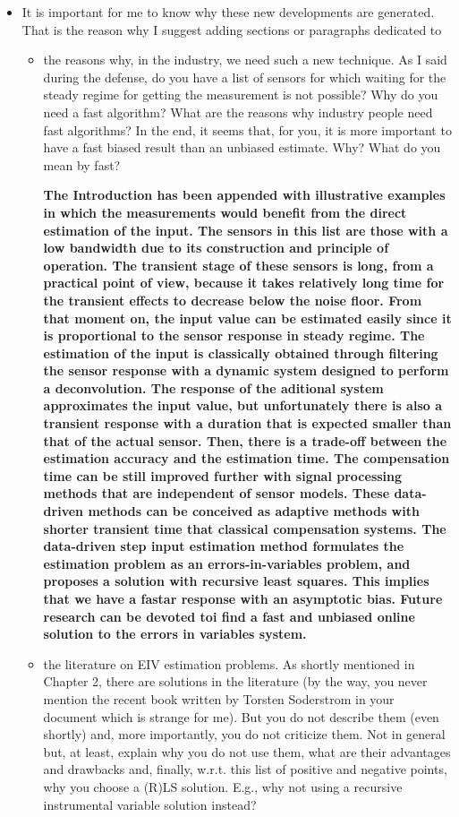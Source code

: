 \documentclass[11pt]{article}
\begin{document}
\begin{itemize}
	\item It is important for me to know why these new developments are generated. That is the reason why I suggest adding sections or paragraphs dedicated to
    \begin{itemize}
        \item the reasons why, in the industry, we need such a new technique. As I said during the defense, do you have a list of sensors for which waiting for the steady regime for getting the measurement is not possible? Why do you need a fast algorithm? What are the reasons why industry people need fast algorithms? In the end, it seems that, for you, it is more important to have a fast biased result than an unbiased estimate. Why? What do you mean by fast?
        
        {\bfseries The Introduction has been appended with illustrative examples in which the measurements would benefit from the direct estimation of the input. The sensors in this list are those with a low bandwidth due to its construction and principle of operation. The transient stage of these sensors is long, from a practical point of view, because it takes relatively long time for the transient effects to decrease below the noise floor. From that moment on, the input value can be estimated easily since it is proportional to the sensor response in steady regime. The estimation of the input is classically obtained through filtering the sensor response with a dynamic system designed to perform a deconvolution. The response of the aditional system approximates the input value, but unfortunately there is also a transient response with a duration that is expected smaller than that of the actual sensor. Then, there is a trade-off between the estimation accuracy and the estimation time. The compensation time can be still improved further with signal processing methods that are independent of sensor models. These data-driven methods can be conceived as adaptive methods with shorter transient time that classical compensation systems. The data-driven step input estimation method formulates the estimation problem as an errors-in-variables problem, and proposes a solution with recursive least squares. This implies that we have a fastar response with an asymptotic bias. Future research can be devoted toi find a fast and unbiased online solution to the errors in variables system. }
        
        \item  the literature on EIV estimation problems. As shortly mentioned in Chapter 2, there are solutions in the literature (by the way, you never mention the recent book written by Torsten Soderstrom in your document which is strange for me). But you do not describe them (even shortly) and, more importantly, you do not criticize them. Not in general but, at least, explain why you do not use them, what are their advantages and drawbacks and, finally, w.r.t. this list of positive and negative points, why you choose a (R)LS solution. E.g., why not using a recursive instrumental variable solution instead?
        

\end{itemize}
\end{itemize}
\end{document}
